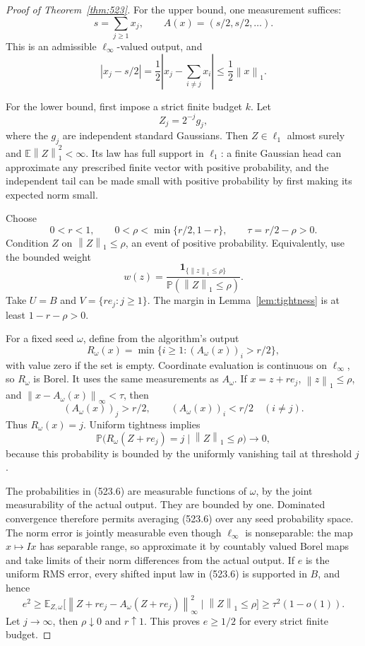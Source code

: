 \documentclass[11pt,a4paper]{article}
\newcommand{\E}{\mathbb E}
\newcommand{\Pbb}{\mathbb P}
\newcommand{\norm}[1]{\left\lVert#1\right\rVert}
\newcommand{\abs}[1]{\left\lvert#1\right\rvert}
\theoremstyle{definition}
\theoremstyle{remark}
\numberwithin{equation}{section}
\begin{document}
\begin{proof}[Proof of Theorem~\ref{thm:523}]
For the upper bound, one measurement suffices:
\[
 s=\sum_{j\ge1}x_j,\qquad A(x)=(s/2,s/2,\ldots).
\]
This is an admissible \(\ell_\infty\)-valued output, and
\[
 \abs{x_j-s/2}
   =\frac12\abs{x_j-\sum_{i\ne j}x_i}
   \le\frac12\norm x_1 .
 \tag{523.1}
\]

For the lower bound, first impose a strict finite budget \(k\).
Let
\[
                    Z_j=2^{-j}g_j,
\]
where the \(g_j\) are independent standard Gaussians.
Then \(Z\in\ell_1\) almost surely and \(\E\norm Z_1^2<\infty\).
Its law has full support in \(\ell_1\): a finite Gaussian head can
approximate any prescribed finite vector with positive probability,
and the independent tail can be made small with positive probability
by first making its expected norm small.

Choose
\[
        0<r<1,\qquad 0<\rho<\min\{r/2,1-r\},\qquad
        \tau=r/2-\rho>0 .
 \tag{523.2}
\]
Condition \(Z\) on \(\norm Z_1\le\rho\), an event of positive
probability. Equivalently, use the bounded weight
\[
 w(z)=\frac{\mathbf1_{\{\norm z_1\le\rho\}}}
                 {\Pbb(\norm Z_1\le\rho)}.
 \tag{523.3}
\]
Take \(U=B\) and \(V=\{re_j:j\ge1\}\). The margin in
Lemma~\ref{lem:tightness} is at least \(1-r-\rho>0\).

For a fixed seed \(\omega\), define from the algorithm's output
\[
 R_\omega(x)=\min\{i\ge1:(A_\omega(x))_i>r/2\},
 \tag{523.4}
\]
with value zero if the set is empty. Coordinate evaluation is continuous
on \(\ell_\infty\), so \(R_\omega\) is Borel. It uses the same
measurements as \(A_\omega\). If \(x=z+re_j\), \(\norm z_1\le\rho\),
and \(\norm{x-A_\omega(x)}_\infty<\tau\), then
\[
 (A_\omega(x))_j>r/2,\qquad
 (A_\omega(x))_i<r/2\quad(i\ne j).
 \tag{523.5}
\]
Thus \(R_\omega(x)=j\). Uniform tightness implies
\[
 \Pbb\bigl(R_\omega(Z+re_j)=j\mid\norm Z_1\le\rho\bigr)
       \longrightarrow0,
 \tag{523.6}
\]
because this probability is bounded by the uniformly vanishing tail
at threshold \(j\).

The probabilities in (523.6) are measurable functions of \(\omega\),
by the joint measurability of the actual output. They are bounded by
one. Dominated convergence therefore permits averaging (523.6) over
any seed probability space. The norm error is jointly measurable even
though \(\ell_\infty\) is nonseparable: the map \(x\mapsto Ix\) has
separable range, so approximate it by countably valued Borel maps and
take limits of their norm differences from the actual output.
If \(e\) is the uniform RMS error, every shifted input law in
(523.6) is supported in \(B\), and hence
\[
 e^2\ge
 \E_{Z,\omega}\bigl[\norm{Z+re_j-A_\omega(Z+re_j)}_\infty^2
                    \mid\norm Z_1\le\rho\bigr]
 \ge \tau^2(1-o(1)).
 \tag{523.7}
\]
Let \(j\to\infty\), then \(\rho\downarrow0\) and \(r\uparrow1\).
This proves \(e\ge1/2\) for every strict finite budget.


\end{proof}
\end{document}
